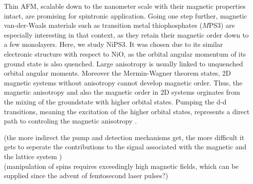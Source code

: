Thin AFM, scalable down to the nanometer scale with their magnetic properties intact, are promising for spintronic application.
Going one step further, magnetic van-der-Waals materials such as transition metal thiophosphates ($M$PS3) are especially interesting in that context, as they retain their magnetic order down to a few monolayers.
Here, we study NiPS3.
It was chosen due to its similar electronic structure with respect to NiO, as the orbital angular momentum of its ground state is also quenched.
Large anisotropy is usually linked to unquenched orbital angular moments.
Moreover the Mermin-Wagner theorem states, 2D magnetic systems without anisotropy cannot develop magnetic order.
Thus, the magnetic anisotropy and also the magnetic order in 2D systems orginates from the mixing of the groundstate with higher orbital states.
Pumping the d-d transitions, meaning the excitation of the higher orbital states, represents a direct path to controling the magnetic anisotropy \cite{afanasiev_controlling_2021}.


(the more indirect the pump and detection mechanisms get, the more difficult it gets to seperate the contributions to the signal associated with the magnetic and the lattice system \cite{fiebig_ultrafast_2008}) \\
(manipulation of spins requires exceedingly high magnetic fields, which can be supplied since the advent of femtosecond laser pulses?)

